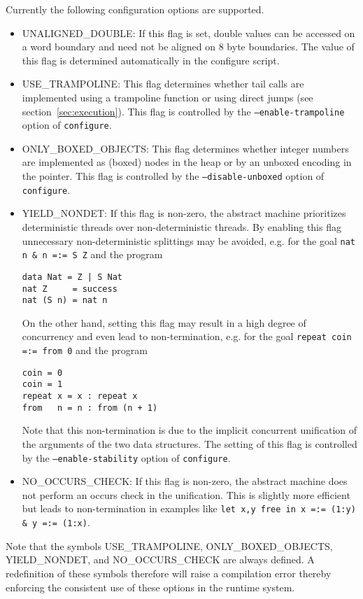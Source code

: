 Currently the following configuration options are supported.
\begin{itemize}
\item {\Tt{}UNALIGNED{\_}DOUBLE\nwendquote}: If this flag is set, double values can be
  accessed on a word boundary and need not be aligned on 8 byte
  boundaries. The value of this flag is determined automatically in
  the {\Tt{}configure\nwendquote} script.
\item {\Tt{}USE{\_}TRAMPOLINE\nwendquote}: This flag determines whether tail calls are
  implemented using a trampoline function or using direct jumps (see
  section~\ref{sec:execution}). This flag is controlled by the
  \texttt{--enable-trampoline} option of \texttt{configure}.
\item {\Tt{}ONLY{\_}BOXED{\_}OBJECTS\nwendquote}: This flag determines whether integer
  numbers are implemented as (boxed) nodes in the heap or by an
  unboxed encoding in the pointer. This flag is controlled by
  the \texttt{--disable-unboxed} option of \texttt{configure}.
\item {\Tt{}YIELD{\_}NONDET\nwendquote}: If this flag is non-zero, the abstract machine
  prioritizes deterministic threads over non-deterministic threads. By
  enabling this flag unnecessary non-deterministic splittings may be
  avoided, e.g. for the goal \verb|nat n & n =:= S Z| and the program
\begin{verbatim}
data Nat = Z | S Nat
nat Z     = success
nat (S n) = nat n
\end{verbatim}
  On the other hand, setting this flag may result in a high degree of
  concurrency and even lead to non-termination, e.g. for the goal
  \verb|repeat coin =:= from 0| and the program
\begin{verbatim}
coin = 0
coin = 1
repeat x = x : repeat x
from   n = n : from (n + 1)
\end{verbatim}
  Note that this non-termination is due to the implicit concurrent
  unification of the arguments of the two data structures. The setting
  of this flag is controlled by the \texttt{--enable-stability} option
  of \texttt{configure}.
\item {\Tt{}NO{\_}OCCURS{\_}CHECK\nwendquote}: If this flag is non-zero, the abstract
  machine does not perform an occurs check in the unification. This
  is slightly more efficient but leads to non-termination in examples
  like \verb|let x,y free in x =:= (1:y) & y =:= (1:x)|.
\end{itemize}
Note that the symbols {\Tt{}USE{\_}TRAMPOLINE\nwendquote}, {\Tt{}ONLY{\_}BOXED{\_}OBJECTS\nwendquote},
{\Tt{}YIELD{\_}NONDET\nwendquote}, and {\Tt{}NO{\_}OCCURS{\_}CHECK\nwendquote} are always defined. A
redefinition of these symbols therefore will raise a compilation error
thereby enforcing the consistent use of these options in the runtime
system.


